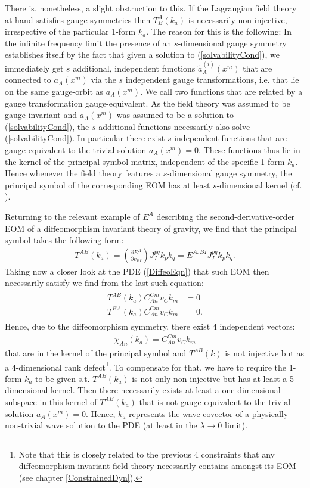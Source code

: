 There is, nonetheless, a slight obstruction to this. If the Lagrangian field theory at hand satisfies gauge symmetries then $T^A_B(k_a)$ is necessarily non-injective, irrespective of the particular 1-form $k_a$. The reason for this is the following: In the infinite frequency limit the presence of an $s$-dimensional gauge symmetry establishes itself by the fact that given a solution to (\ref{solvabilityCond}), we immediately get $s$ additional, independent functions $\tilde{a}^{(i)}_A(x^m)$ that are connected to $a_A(x^m)$ via the $s$ independent gauge transformations, i.e. that lie on the same gauge-orbit as $a_A(x^m)$. We call two functions that are related by a gauge transformation gauge-equivalent. As the field theory was assumed to be gauge invariant and $a_A(x^m)$ was assumed to be a solution to (\ref{solvabilityCond}), the $s$ additional functions necessarily also solve (\ref{solvabilityCond}). In particular there exist $s$ independent functions that are gauge-equivalent to the trivial solution $a_A(x^m) = 0$.    
These functions thus lie in the kernel of the principal symbol matrix, independent of the specific 1-form $k_a$.
Hence whenever the field theory features a $s$-dimensional gauge symmetry, the principal symbol of the corresponding EOM has at least $s$-dimensional kernel (cf. \cite{2018PhRvD..97h4036D}). 

Returning to the relevant example of $E^A$ describing the second-derivative-order EOM of a diffeomorphism invariant theory of gravity, we find that the principal symbol takes the following form:
\begin{align}
    T^{A B} (k_a) = \left (\frac{\partial E^A}{\partial v_{BI}} \right )J_I^{pq} k_p k_q = E^{A: BI} J_I^{pq} k_p k_q.
\end{align}
Taking now a closer look at the PDE (\ref{DiffeoEqn}) that such EOM then necessarily  satisfy we find from the last such equation:
\begin{align}\label{symbolDef}
\begin{aligned}
    T^{A B} (k_a) C_{An}^{Cm}v_Ck_m &= 0 \\
    T^{B A} (k_a) C_{An}^{Cm}v_Ck_m &= 0 .
\end{aligned}
\end{align}
Hence, due to the diffeomorphism symmetry, there exist $4$ independent vectors:
\begin{align}
   \chi_{An}(k_a) =  C_{An}^{Cm}v_Ck_m
\end{align}
that are in the kernel of the principal symbol and $T^{AB}(k)$ is not injective but as a 4-dimensional rank defect\footnote{Note that this is closely related to the previous $4$ constraints that any diffeomorphism invariant field theory necessarily contains amongst its EOM (see chapter \ref{ConstrainedDyn}).}. To compensate for that, we have to require the 1-form $k_a$ to be given s.t. $T^{AB}(k_a)$ is not only non-injective but has at least a 5-dimensional kernel. Then there necessarily exists at least a one dimensional subspace in this kernel of $T^{AB}(k_a)$ that is not gauge-equivalent to the trivial solution $a_A(x^m) = 0$. Hence, $k_a$ represents the wave covector of a physically non-trivial wave solution to the PDE (at least in the $\lambda \rightarrow 0$ limit).

